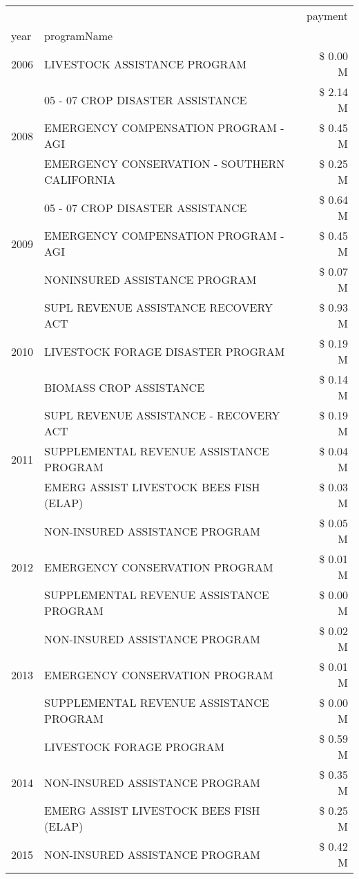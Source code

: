 \begin{tabular}{llr}
\toprule
 &  & payment \\
year & programName &  \\
\midrule
2006 & LIVESTOCK ASSISTANCE PROGRAM & \$ 0.00 M \\
\cline{1-3}
\multirow[t]{3}{*}{2008} & 05 - 07 CROP DISASTER ASSISTANCE & \$ 2.14 M \\
 & EMERGENCY COMPENSATION PROGRAM - AGI & \$ 0.45 M \\
 & EMERGENCY CONSERVATION - SOUTHERN CALIFORNIA & \$ 0.25 M \\
\cline{1-3}
\multirow[t]{3}{*}{2009} & 05 - 07 CROP DISASTER ASSISTANCE & \$ 0.64 M \\
 & EMERGENCY COMPENSATION PROGRAM - AGI & \$ 0.45 M \\
 & NONINSURED ASSISTANCE PROGRAM & \$ 0.07 M \\
\cline{1-3}
\multirow[t]{3}{*}{2010} & SUPL REVENUE ASSISTANCE RECOVERY ACT & \$ 0.93 M \\
 & LIVESTOCK FORAGE DISASTER  PROGRAM & \$ 0.19 M \\
 & BIOMASS CROP ASSISTANCE & \$ 0.14 M \\
\cline{1-3}
\multirow[t]{3}{*}{2011} & SUPL REVENUE ASSISTANCE - RECOVERY ACT & \$ 0.19 M \\
 & SUPPLEMENTAL REVENUE ASSISTANCE PROGRAM & \$ 0.04 M \\
 & EMERG ASSIST LIVESTOCK BEES FISH (ELAP) & \$ 0.03 M \\
\cline{1-3}
\multirow[t]{3}{*}{2012} & NON-INSURED ASSISTANCE PROGRAM & \$ 0.05 M \\
 & EMERGENCY CONSERVATION PROGRAM & \$ 0.01 M \\
 & SUPPLEMENTAL REVENUE ASSISTANCE PROGRAM & \$ 0.00 M \\
\cline{1-3}
\multirow[t]{3}{*}{2013} & NON-INSURED ASSISTANCE PROGRAM & \$ 0.02 M \\
 & EMERGENCY CONSERVATION PROGRAM & \$ 0.01 M \\
 & SUPPLEMENTAL REVENUE ASSISTANCE PROGRAM & \$ 0.00 M \\
\cline{1-3}
\multirow[t]{3}{*}{2014} & LIVESTOCK FORAGE PROGRAM & \$ 0.59 M \\
 & NON-INSURED ASSISTANCE PROGRAM & \$ 0.35 M \\
 & EMERG ASSIST LIVESTOCK BEES FISH (ELAP) & \$ 0.25 M \\
\cline{1-3}
\multirow[t]{3}{*}{2015} & NON-INSURED ASSISTANCE PROGRAM & \$ 0.42 M \\

\end{tabular}
